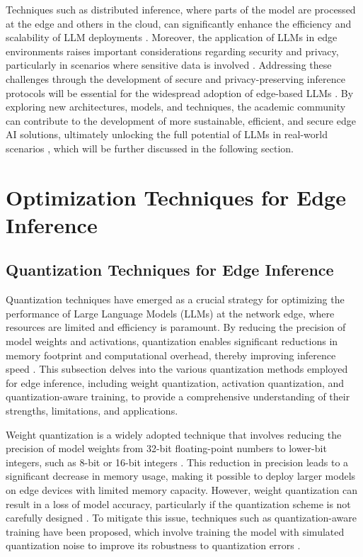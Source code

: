 \documentclass[11pt,a4paper]{article}
\begin{document}
Techniques such as distributed inference, where parts of the model are processed at the edge and others in the cloud, can significantly enhance the efficiency and scalability of LLM deployments \cite{doi:10.1109/comsnets53615.2022.9668515}. Moreover, the application of LLMs in edge environments raises important considerations regarding security and privacy, particularly in scenarios where sensitive data is involved \cite{doi:10.1109/compsac61105.2024.00206}. Addressing these challenges through the development of secure and privacy-preserving inference protocols will be essential for the widespread adoption of edge-based LLMs \cite{arxiv:2511.22788}. By exploring new architectures, models, and techniques, the academic community can contribute to the development of more sustainable, efficient, and secure edge AI solutions, ultimately unlocking the full potential of LLMs in real-world scenarios \cite{doi:10.1109/access.2024.3351308}, which will be further discussed in the following section.


\section{Optimization Techniques for Edge Inference}



\subsection{Quantization Techniques for Edge Inference}


Quantization techniques have emerged as a crucial strategy for optimizing the performance of Large Language Models (LLMs) at the network edge, where resources are limited and efficiency is paramount. By reducing the precision of model weights and activations, quantization enables significant reductions in memory footprint and computational overhead, thereby improving inference speed \cite{doi:10.1109/access.2024.3501358}. This subsection delves into the various quantization methods employed for edge inference, including weight quantization, activation quantization, and quantization-aware training, to provide a comprehensive understanding of their strengths, limitations, and applications.

Weight quantization is a widely adopted technique that involves reducing the precision of model weights from 32-bit floating-point numbers to lower-bit integers, such as 8-bit or 16-bit integers \cite{arxiv:2402.06196}. This reduction in precision leads to a significant decrease in memory usage, making it possible to deploy larger models on edge devices with limited memory capacity. However, weight quantization can result in a loss of model accuracy, particularly if the quantization scheme is not carefully designed \cite{arxiv:2404.14294}. To mitigate this issue, techniques such as quantization-aware training have been proposed, which involve training the model with simulated quantization noise to improve its robustness to quantization errors \cite{doi:10.1007/s42452-025-07668-w}.
\end{document}
